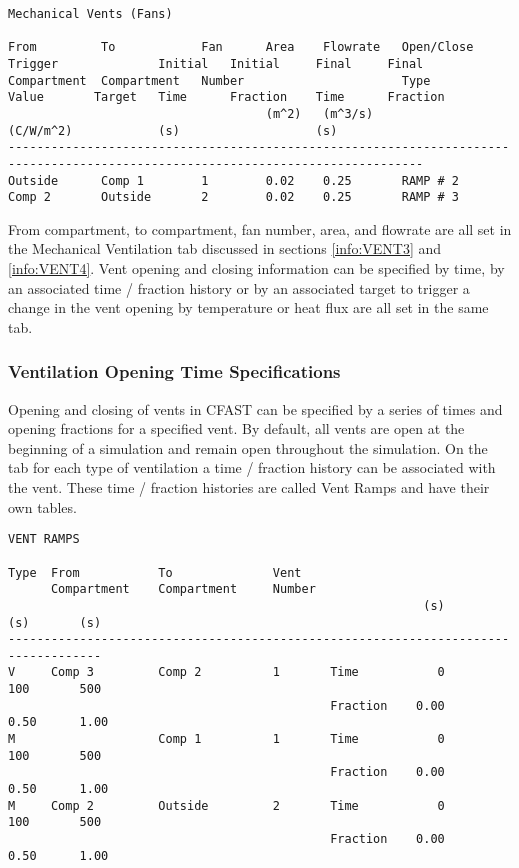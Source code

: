 \begin{lstlisting}[basicstyle=\tiny]
Mechanical Vents (Fans)

From         To            Fan      Area    Flowrate   Open/Close  Trigger              Initial   Initial     Final     Final
Compartment  Compartment   Number                      Type        Value       Target   Time      Fraction    Time      Fraction
                                    (m^2)   (m^3/s)                (C/W/m^2)            (s)                   (s)
--------------------------------------------------------------------------------------------------------------------------------
Outside      Comp 1        1        0.02    0.25       RAMP # 2
Comp 2       Outside       2        0.02    0.25       RAMP # 3  
\end{lstlisting}
From compartment, to compartment, fan number, area, and flowrate are all set in the Mechanical Ventilation tab discussed in sections \ref{info:VENT3} and \ref{info:VENT4}.  Vent opening and closing information can be specified by time, by an associated time / fraction history or by an associated target to trigger a change in the vent opening by temperature or heat flux are all set in the same tab.


\subsubsection{Ventilation Opening Time Specifications}

Opening and closing of vents in CFAST can be specified by a series of times and opening fractions for a specified vent. By default, all vents are open at the beginning of a simulation and remain open throughout the simulation. On the tab for each type of ventilation a time / fraction history can be associated with the vent. These time / fraction histories are called Vent Ramps and have their own tables.
\begin{lstlisting}[basicstyle=\tiny]
VENT RAMPS

Type  From           To              Vent
      Compartment    Compartment     Number
                                                          (s)       (s)       (s)  
-----------------------------------------------------------------------------------
V     Comp 3         Comp 2          1       Time           0       100       500
                                             Fraction    0.00      0.50      1.00
M                    Comp 1          1       Time           0       100       500
                                             Fraction    0.00      0.50      1.00
M     Comp 2         Outside         2       Time           0       100       500
                                             Fraction    0.00      0.50      1.00
\end{lstlisting}

